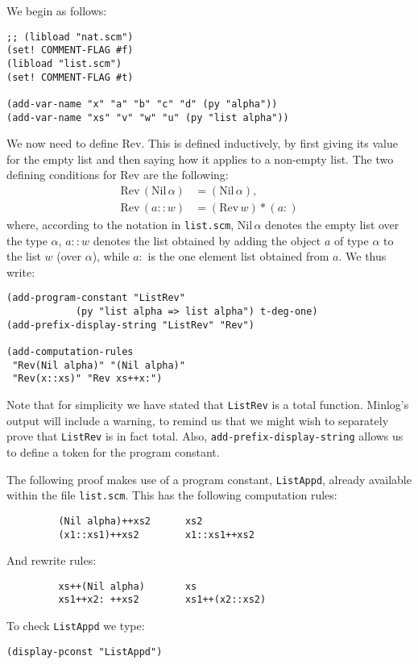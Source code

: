 \documentclass[12pt]{amsart}
\newcommand{\nil}{\mathrm{Nil}}
\newcommand{\listappend}{\mathbin{\ast}}
\newcommand{\listrev}{\mathrm{Rev}}
\newcommand{\mi}{Minlog}
\begin{document}
We begin as follows:
\begin{verbatim}
;; (libload "nat.scm")
(set! COMMENT-FLAG #f)
(libload "list.scm")
(set! COMMENT-FLAG #t)

(add-var-name "x" "a" "b" "c" "d" (py "alpha"))
(add-var-name "xs" "v" "w" "u" (py "list alpha"))
\end{verbatim}

We now need to define $\listrev$.  This is defined inductively, by
first giving its value for the empty list and then saying how it
applies to a non-empty list.  The two defining conditions for
$\listrev$ are the following:
\begin{align*}
\listrev\,(\nil\, \alpha) &= (\nil\, \alpha),
\\
\listrev\,(a::w) &= (\listrev\, w) \listappend (a{:})
\end{align*}
where, according to the notation in \texttt{list.scm}, $\nil\, \alpha$
denotes the empty list over the type $\alpha$, $a::w$ denotes the list
obtained by adding the object $a$ of type $\alpha$ to the list $w$
(over $\alpha$), while $a{:}$ is the one element list obtained from
$a$.  We thus write:
\begin{verbatim}
(add-program-constant "ListRev"
            (py "list alpha => list alpha") t-deg-one)
(add-prefix-display-string "ListRev" "Rev")

(add-computation-rules
 "Rev(Nil alpha)" "(Nil alpha)"
 "Rev(x::xs)" "Rev xs++x:")
\end{verbatim}

Note that for simplicity we have stated that \texttt{ListRev} is a
total function.  \mi's output will include a warning, to remind us
that we might wish to separately prove that \texttt{ListRev} is in
fact total.  Also, \texttt{add-prefix-display-string} allows us to
define a token for the program constant.

The following proof makes use of a program constant,
\texttt{ListAppd}, already available within the file
\texttt{list.scm}.  This has the following computation rules:
\begin{verbatim}
         (Nil alpha)++xs2      xs2
         (x1::xs1)++xs2        x1::xs1++xs2
\end{verbatim}
And rewrite rules:
\begin{verbatim}
         xs++(Nil alpha)       xs
         xs1++x2: ++xs2        xs1++(x2::xs2)
\end{verbatim}

To check \texttt{ListAppd} we type:
\begin{verbatim}
(display-pconst "ListAppd")
\end{verbatim}
\end{document}
